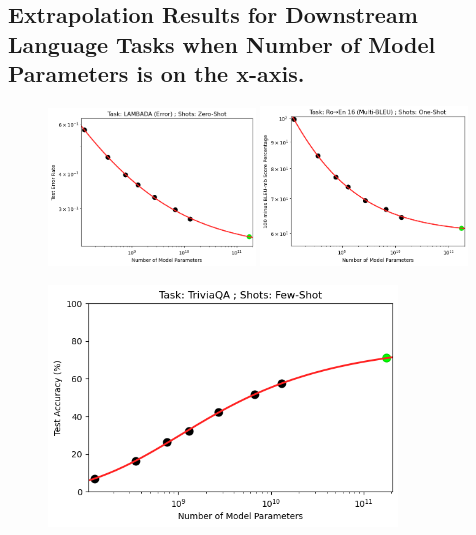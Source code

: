 \documentclass{article} %
\begin{document}
\fi

\clearpage

\subsection{Extrapolation Results for Downstream Language Tasks when Number of Model Parameters is on the x-axis.}
\label{section:language_tasks__number_of_parameters}
\begin{figure}[htbp]
    \centering

\includegraphics[width=0.49\textwidth]{figures/gpt-3__parameter_scaling/LAMBADA__Error____Zero-Shot.png} \includegraphics[width=0.49\textwidth]{figures/gpt-3__parameter_scaling/Ro_to_En_16__Multi-BLEU____One-Shot.png}

\includegraphics[width=0.825\textwidth]{figures/gpt-3__parameter_scaling/TriviaQA___Few-Shot.png}


\end{figure}
\end{document}
